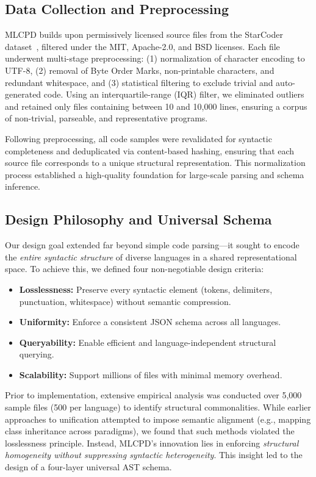 \documentclass{article}
\begin{document}
\subsection{Data Collection and Preprocessing}
MLCPD builds upon permissively licensed source files from the StarCoder dataset~\cite{starcoder}, filtered under the MIT, Apache-2.0, and BSD licenses. Each file underwent multi-stage preprocessing: (1) normalization of character encoding to UTF-8, (2) removal of Byte Order Marks, non-printable characters, and redundant whitespace, and (3) statistical filtering to exclude trivial and auto-generated code. Using an interquartile-range (IQR) filter, we eliminated outliers and retained only files containing between 10 and 10,000 lines, ensuring a corpus of non-trivial, parseable, and representative programs.  

Following preprocessing, all code samples were revalidated for syntactic completeness and deduplicated via content-based hashing, ensuring that each source file corresponds to a unique structural representation. This normalization process established a high-quality foundation for large-scale parsing and schema inference.

\subsection{Design Philosophy and Universal Schema}
Our design goal extended far beyond simple code parsing—it sought to encode the \emph{entire syntactic structure} of diverse languages in a shared representational space. To achieve this, we defined four non-negotiable design criteria:  
\begin{itemize}
    \item \textbf{Losslessness:} Preserve every syntactic element (tokens, delimiters, punctuation, whitespace) without semantic compression.  
    \item \textbf{Uniformity:} Enforce a consistent JSON schema across all languages.  
    \item \textbf{Queryability:} Enable efficient and language-independent structural querying.  
    \item \textbf{Scalability:} Support millions of files with minimal memory overhead.  
\end{itemize}

Prior to implementation, extensive empirical analysis was conducted over 5,000 sample files (500 per language) to identify structural commonalities. While earlier approaches to unification attempted to impose semantic alignment (e.g., mapping class inheritance across paradigms), we found that such methods violated the losslessness principle. Instead, MLCPD’s innovation lies in enforcing \emph{structural homogeneity without suppressing syntactic heterogeneity}. This insight led to the design of a four-layer universal AST schema.
\end{document}
